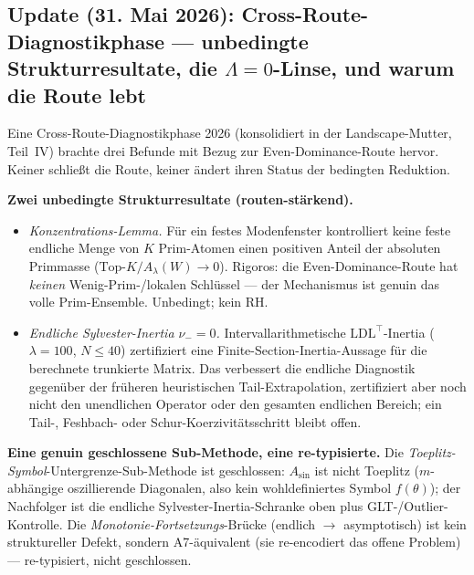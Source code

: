 \documentclass[11pt,a4paper]{article}
\theoremstyle{remark}
\theoremstyle{plain}
\begin{document}
\subsection{Update (31. Mai 2026): Cross-Route-Diagnostikphase --- unbedingte Strukturresultate, die \texorpdfstring{$\Lambda=0$}{Lambda=0}-Linse, und warum die Route lebt}

Eine Cross-Route-Diagnostikphase 2026 (konsolidiert in der Landscape-Mutter,
Teil~IV) brachte drei Befunde mit Bezug zur Even-Dominance-Route hervor. Keiner
schließt die Route, keiner ändert ihren Status der bedingten Reduktion.

\medskip\noindent\textbf{Zwei unbedingte Strukturresultate (routen-stärkend).}
\begin{itemize}[leftmargin=*]
  \item \emph{Konzentrations-Lemma.} Für ein festes Modenfenster kontrolliert keine
    feste endliche Menge von $K$ Prim-Atomen einen positiven Anteil der absoluten
    Primmasse ($\mathrm{Top}\text{-}K/A_\lambda(W)\to 0$). Rigoros: die
    Even-Dominance-Route hat \emph{keinen} Wenig-Prim-/lokalen Schlüssel --- der
    Mechanismus ist genuin das volle Prim-Ensemble. Unbedingt; kein RH.
  \item \emph{Endliche Sylvester-Inertia $\nu_-=0$.} Intervallarithmetische
    $\mathrm{LDL}^\top$-Inertia ($\lambda=100$, $N\le 40$) zertifiziert eine
    Finite-Section-Inertia-Aussage für die berechnete trunkierte Matrix. Das
    verbessert die endliche Diagnostik gegenüber der früheren heuristischen
    Tail-Extrapolation, zertifiziert aber noch nicht den unendlichen Operator oder
    den gesamten endlichen Bereich; ein Tail-, Feshbach- oder
    Schur-Koerzivitätsschritt bleibt offen.
\end{itemize}

\medskip\noindent\textbf{Eine genuin geschlossene Sub-Methode, eine re-typisierte.}
Die \emph{Toeplitz-Symbol}-Untergrenze-Sub-Methode ist geschlossen: $A_{\sin}$ ist
nicht Toeplitz ($m$-abhängige oszillierende Diagonalen, also kein wohldefiniertes
Symbol $f(\theta)$); der Nachfolger ist die endliche Sylvester-Inertia-Schranke
oben plus GLT-/Outlier-Kontrolle. Die \emph{Monotonie-Fortsetzungs}-Brücke
(endlich $\to$ asymptotisch) ist kein struktureller Defekt, sondern A7-äquivalent
(sie re-encodiert das offene Problem) --- re-typisiert, nicht geschlossen.
\end{document}
